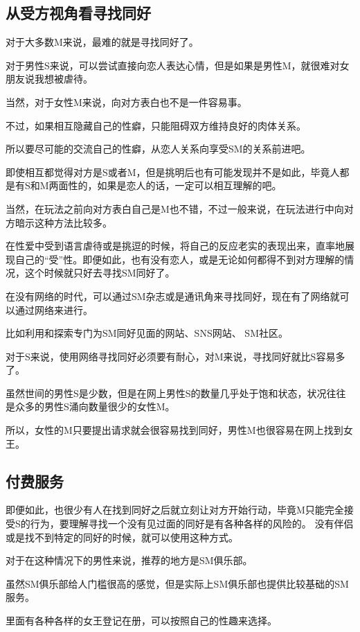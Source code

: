 \documentclass[12pt,UTF8]{ctexbook}
\begin{document}
\subsection{从受方视角看寻找同好}

对于大多数M来说，最难的就是寻找同好了。

对于男性S来说，可以尝试直接向恋人表达心情，但是如果是男性M，就很难对女朋友说我想被虐待。

当然，对于女性M来说，向对方表白也不是一件容易事。

不过，如果相互隐藏自己的性癖，只能阻碍双方维持良好的肉体关系。

所以要尽可能的交流自己的性癖，从恋人关系向享受SM的关系前进吧。

即使相互都觉得对方是S或者M，但是挑明后也有可能发现并不是如此，毕竟人都是有S和M两面性的，如果是恋人的话，一定可以相互理解的吧。

当然，在玩法之前向对方表白自己是M也不错，不过一般来说，在玩法进行中向对方暗示这种方法比较多。

在性爱中受到语言虐待或是挑逗的时候，将自己的反应老实的表现出来，直率地展现自己的“受”性。即便如此，也有没有恋人，或是无论如何都得不到对方理解的情况，这个时候就只好去寻找SM同好了。

在没有网络的时代，可以通过SM杂志或是通讯角来寻找同好，现在有了网络就可以通过网络来进行。

比如利用和探索专门为SM同好见面的网站、SNS网站、 SM社区。

对于S来说，使用网络寻找同好必须要有耐心，对M来说，寻找同好就比S容易多了。

虽然世间的男性S是少数，但是在网上男性S的数量几乎处于饱和状态，状况往往是众多的男性S涌向数量很少的女性M。

所以，女性的M只要提出请求就会很容易找到同好，男性M也很容易在网上找到女王。

\subsection{付费服务}

即便如此，也很少有人在找到同好之后就立刻让对方开始行动，毕竟M只能完全接受S的行为，要理解寻找一个没有见过面的同好是有各种各样的风险的。 没有伴侣或是找不到特定的同好的时候，就可以使用这种方式。

对于在这种情况下的男性来说，推荐的地方是SM俱乐部。

虽然SM俱乐部给人门槛很高的感觉，但是实际上SM俱乐部也提供比较基础的SM服务。

里面有各种各样的女王登记在册，可以按照自己的性趣来选择。
\end{document}
